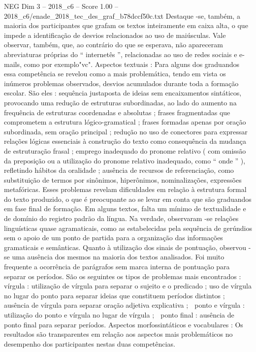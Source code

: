 \begin{textsample}{NEG Dim 3 – 2018\_c6 – Score 1.00 – 2018\_c6/enade\_2018\_tec\_des\_graf\_b78dccf50c.txt}
Destaque -se, também, a maioria dos participantes que grafam os textos inteiramente em caixa alta, o que impede a identificação de desvios relacionados ao uso de maiúsculas.
Vale observar, também, que, ao contrário do que se esperava, não apareceram abreviaturas próprias do “ internetês ”, relacionadas ao uso de redes sociais e e-mails, como por exemplo"vc".
Aspectos textuais : Para alguns dos graduandos essa competência se revelou como a mais problemática, tendo em vista os inúmeros problemas observados, desvios acumulados durante toda a formação escolar.
São eles : sequência justaposta de ideias sem encaixamentos sintáticos, provocando uma redução de estruturas subordinadas, ao lado do aumento na frequência de estruturas coordenadas e absolutas ; frases fragmentadas que comprometem a estrutura lógico-gramatical ; frases formadas apenas por oração subordinada, sem oração principal ; redução no uso de conectores para expressar relações lógicas essenciais à construção do texto como consequência da mudança de estruturação frasal ; emprego inadequado do pronome relativo ( com omissão da preposição ou a utilização do pronome relativo inadequado, como “ onde ” ), refletindo hábitos da oralidade ; ausência de recursos de referenciação, como substituição de termos por sinônimos, hiperônimos, nominalizações, expressões metafóricas.
Esses problemas revelam dificuldades em relação à estrutura formal do texto produzido, o que é preocupante ao se levar em conta que são graduandos em fase final de formação.
Em alguns textos, falta um mínimo de textualidade e de domínio do registro padrão da língua.
Na verdade, observaram -se relações linguísticas quase agramaticais, como as estabelecidas pela sequência de gerúndios sem o apoio de um ponto de partida para a organização das informações gramaticais e semânticas.
Quanto à utilização dos sinais de pontuação, observou -se uma ausência dos mesmos na maioria dos textos analisados.
Foi muito frequente a ocorrência de parágrafos sem marca interna de pontuação para separar os períodos.
São os seguintes os tipos de problemas mais encontrados :  vírgula : utilização de vírgula para separar o sujeito e o predicado ; uso de vírgula no lugar do ponto para separar ideias que constituem períodos distintos ; ausência de vírgula para separar oração adjetiva explicativa ;  ponto e vírgula : utilização do ponto e vírgula no lugar de vírgula ;  ponto final : ausência de ponto final para separar períodos.
Aspectos morfossintáticos e vocabulares : Os resultados são transparentes em relação aos aspectos mais problemáticos no desempenho dos participantes nestas duas competências.

\end{textsample}
